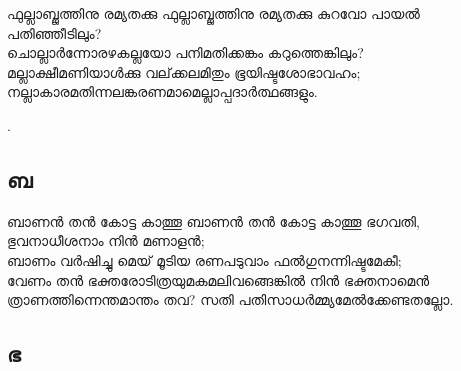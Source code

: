 \begin{enumerate}


\begin{slokam}{\VSv}{\KV}{ഫുല്ലാബ്ജത്തിനു രമ്യതക്കു}
ഫുല്ലാബ്ജത്തിനു രമ്യതക്കു കുറവോ പായല്‍ പതിഞ്ഞീടിലും?\\
ചൊല്ലാര്‍ന്നോരഴകല്ലയോ പനിമതിക്കങ്കം കറുത്തെങ്കിലും?\\
മല്ലാക്ഷീമണിയാള്‍ക്കു വല്‌ക്കലമിതും ഭൂയിഷ്ടശോഭാവഹം;\\
നല്ലാകാരമതിന്നലങ്കരണമാമെല്ലാപ്പദാര്‍ത്ഥങ്ങളും.
\end{slokam}


.

\end{enumerate}
\subsection{ബ}
\begin{enumerate}

\begin{slokam}{\VSr}{\VNM}{ബാണൻ തൻ കോട്ട കാത്തൂ}
ബാണൻ തൻ കോട്ട കാത്തൂ ഭഗവതി, ഭുവനാധീശനാം നിൻ മണാളൻ;\\
ബാണം വർഷിച്ചു മെയ്‌ മൂടിയ രണപടുവാം ഫൽഗുനന്നിഷ്ടമേകീ;\\
വേണം തൻ ഭക്തരോടിത്രയുമകമലിവങ്ങെങ്കിൽ നിൻ ഭക്തനാമെൻ\\
ത്രാണത്തിന്നെന്തമാന്തം തവ? സതി പതിസാധർമ്മ്യമേൽക്കേണ്ടതല്ലോ.

\end{slokam}



\end{enumerate}

\subsection{ഭ}

